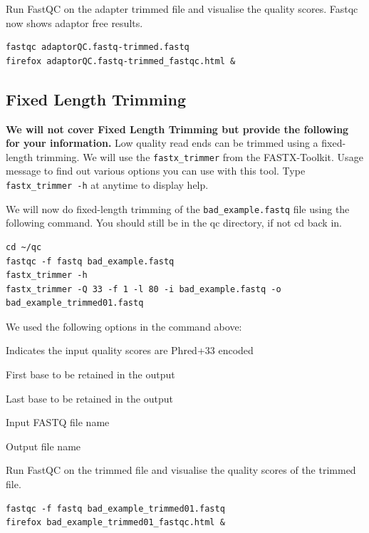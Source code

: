\begin{advanced}
\begin{steps}
Run FastQC on the adapter trimmed file and visualise the quality scores. Fastqc now shows adaptor free results.

\begin{lstlisting}
fastqc adaptorQC.fastq-trimmed.fastq
firefox adaptorQC.fastq-trimmed_fastqc.html &
\end{lstlisting}
\end{steps}

\subsection{Fixed Length Trimming}
\textbf{We will not cover Fixed Length Trimming but
provide the following for your information.}
Low quality read ends can be trimmed using a fixed-length trimming. We will use the
\texttt{fastx\_trimmer} from the FASTX-Toolkit. Usage message to find out various options
you can use with this tool. Type \texttt{fastx\_trimmer -h} at anytime to display help.

\begin{steps}
We will now do fixed-length trimming of the \texttt{bad\_example.fastq} file
using the following command. You should still be in the qc directory, if not cd back in.
\begin{lstlisting}
cd ~/qc
fastqc -f fastq bad_example.fastq 
fastx_trimmer -h
fastx_trimmer -Q 33 -f 1 -l 80 -i bad_example.fastq -o bad_example_trimmed01.fastq
\end{lstlisting}
\end{steps}

\begin{note}
We used the following options in the command above:
\begin{description}[style=multiline,labelindent=0cm,align=right,leftmargin=\descriptionlabelspace,rightmargin=1.5cm,font=\ttfamily]
 \item[-Q 33] Indicates the input quality scores are Phred+33 encoded
 \item[-f] First base to be retained in the output
 \item[-l] Last base to be retained in the output
 \item[-i] Input FASTQ file name
 \item[-o] Output file name
\end{description}
\end{note}

\begin{steps}
Run FastQC on the trimmed file and visualise the quality scores of the trimmed file.
\begin{lstlisting}
fastqc -f fastq bad_example_trimmed01.fastq
firefox bad_example_trimmed01_fastqc.html &
\end{lstlisting}


\end{steps}
\end{advanced}
